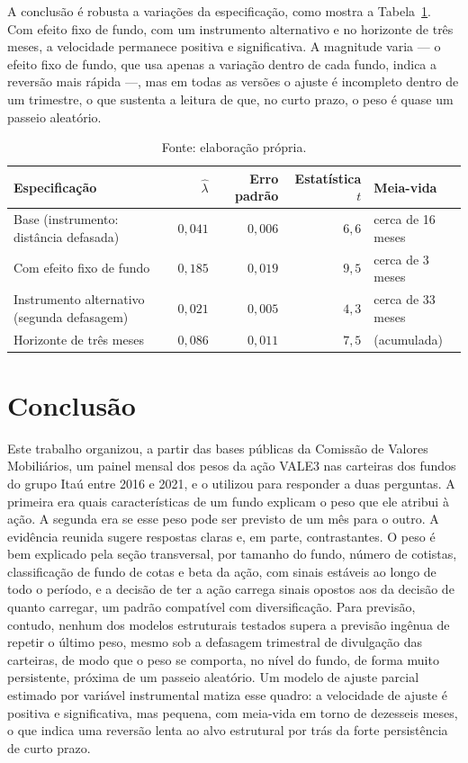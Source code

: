 \documentclass[12pt,a4paper]{article}
\begin{document}
A conclusão é robusta a variações da especificação, como mostra a Tabela~\ref{tab:rob}. Com efeito
fixo de fundo, com um instrumento alternativo e no horizonte de três meses, a velocidade permanece
positiva e significativa. A magnitude varia --- o efeito fixo de fundo, que usa apenas a variação
dentro de cada fundo, indica a reversão mais rápida ---, mas em todas as versões o ajuste é
incompleto dentro de um trimestre, o que sustenta a leitura de que, no curto prazo, o peso é quase
um passeio aleatório.

\begin{table}[h]\centering\small
\caption{Robustez da velocidade de ajuste. Variável instrumental, erro-padrão agrupado por fundo.}
\label{tab:rob}
\begin{tabular}{@{}lrrrl@{}}
\toprule
Especificação & $\widehat{\lambda}$ & Erro padrão & Estatística $t$ & Meia-vida \\
\midrule
Base (instrumento: distância defasada)      & $0{,}041$ & $0{,}006$ & $6{,}6$ & cerca de 16 meses \\
Com efeito fixo de fundo                     & $0{,}185$ & $0{,}019$ & $9{,}5$ & cerca de 3 meses \\
Instrumento alternativo (segunda defasagem)  & $0{,}021$ & $0{,}005$ & $4{,}3$ & cerca de 33 meses \\
Horizonte de três meses                      & $0{,}086$ & $0{,}011$ & $7{,}5$ & (acumulada) \\
\bottomrule
\end{tabular}
\caption*{\footnotesize Fonte: elaboração própria.}
\end{table}

\section{Conclusão}

Este trabalho organizou, a partir das bases públicas da Comissão de Valores Mobiliários, um
painel mensal dos pesos da ação VALE3 nas carteiras dos fundos do grupo Itaú entre 2016 e
2021, e o utilizou para responder a duas perguntas. A primeira era quais características de um
fundo explicam o peso que ele atribui à ação. A segunda era se esse peso pode ser previsto de
um mês para o outro. A evidência reunida sugere respostas claras e, em parte, contrastantes.
O peso é bem explicado pela seção transversal, por tamanho do fundo, número de cotistas,
classificação de fundo de cotas e beta da ação, com sinais estáveis ao longo de todo o
período, e a decisão de ter a ação carrega sinais opostos aos da decisão de quanto carregar,
um padrão compatível com diversificação. Para previsão, contudo, nenhum dos modelos
estruturais testados supera a previsão ingênua de repetir o último peso, mesmo sob a
defasagem trimestral de divulgação das carteiras, de modo que o peso se comporta, no nível do
fundo, de forma muito persistente, próxima de um passeio aleatório. Um modelo de ajuste parcial
estimado por variável instrumental matiza esse quadro: a velocidade de ajuste é positiva e
significativa, mas pequena, com meia-vida em torno de dezesseis meses, o que indica uma reversão
lenta ao alvo estrutural por trás da forte persistência de curto prazo.
\end{document}
